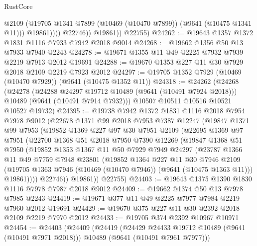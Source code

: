 \begin{lexlean}{RustCore}
\begin{coremodule}
                      @2109
                      (@19705 @1341 @7899 (@10469 (@10470 @7899)) (@9641 (@10475 @1341 @11)))
                      @19861))))
              @22746))
          @19861))
      @22755)
@24262 := @19643 @1357 @1372 @1831 @1116 @7933 @7942 @2018 @9014
@24268 := @19662 @1356 @50 @13 @7933 @7940 @2243
@24278 := @19671 @1355 @11 @49 @2225 @7932 @7939 @2219 @7913 @2012 @19691
@24288 := @19670 @1353 @227 @11 @30 @7929 @2018 @2109 @2219 @7923 @2012
@24297 := @19705 @1352 @7929 (@10469 (@10470 @7929)) (@9641 (@10475 @1352 @11))
@24318 := @24262
    (@24268
      (@24278
        (@24288 @24297 @19712 @10489 (@9641 (@10491 @7924 @2018)))
        @10489
        (@9641 (@10491 @7914 @7932)))
      @10507
      @10511
      @10516
      @10521
      @10527
      @19732)
@24395 := @19738
    @7942
    @1372
    @1831
    @1116
    @2018
    @7954
    @7978
    @9012
    (@22678
      @1371
      @99
      @2018
      @7953
      @7387
      @12247
      (@19847
        @1371
        @99
        @7953
        (@19852
          @1369
          @227
          @97
          @30
          @7951
          @2109
          (@22695
            @1369
            @97
            @7951
            (@22700
              @1368
              @51
              @2018
              @7950
              @7390
              @12269
              (@19847
                @1368
                @51
                @7950
                (@19852
                  @1353
                  @1367
                  @11
                  @50
                  @7929
                  @7949
                  @24297
                  (@23787
                    @1366
                    @11
                    @49
                    @7759
                    @7948
                    @23801
                    (@19852
                      @1364
                      @227
                      @11
                      @30
                      @7946
                      @2109
                      (@19705 @1363 @7946 (@10469 (@10470 @7946)) (@9641 (@10475 @1363 @11)))
                      @19861))))
              @22746))
          @19861))
      @22755)
@24403 := @19643 @1375 @1390 @1830 @1116 @7978 @7987 @2018 @9012
@24409 := @19662 @1374 @50 @13 @7978 @7985 @2243
@24419 := @19671 @377 @11 @49 @2225 @7977 @7984 @2219 @7960 @2012 @19691
@24429 := @19670 @375 @227 @11 @30 @2392 @2018 @2109 @2219 @7970 @2012
@24433 := @19705 @374 @2392 @10967 @10971
@24454 := @24403
    (@24409
      (@24419
        (@24429 @24433 @19712 @10489 (@9641 (@10491 @7971 @2018)))
        @10489
        (@9641 (@10491 @7961 @7977)))

\end{coremodule}
\end{lexlean}
